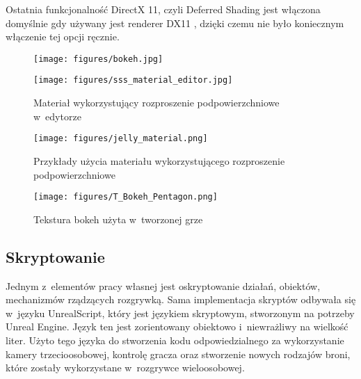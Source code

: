 Ostatnia funkcjonalność DirectX 11, czyli Deferred Shading jest włączona domyślnie gdy używany jest renderer DX11 \cite{udk_deferred_shading}, dzięki czemu nie było koniecznym włączenie tej opcji ręcznie.

\begin{figure}
\begin{center}
\texttt{[image: figures/bokeh.jpg]}
\label{bokeh_example}
\end{center}
\end{figure}

\begin{figure}
\begin{center}
\texttt{[image: figures/sss\_material\_editor.jpg]}
\caption{Materiał wykorzystujący rozproszenie podpowierzchniowe w~edytorze}
\label{sss_material_editor}
\end{center}
\end{figure}

\begin{figure}
\begin{center}
\texttt{[image: figures/jelly\_material.png]}
\caption{Przykłady użycia materiału wykorzystującego rozproszenie podpowierzchniowe}
\label{sss_material_example}
\end{center}
\end{figure}

\begin{figure}
\begin{center}
\texttt{[image: figures/T\_Bokeh\_Pentagon.png]}
\caption{Tekstura bokeh użyta w~tworzonej grze}
\label{bokeh_texture}
\end{center}
\end{figure}

\subsection{Skryptowanie}

Jednym z~elementów pracy własnej jest oskryptowanie działań, obiektów, mechanizmów rządzących rozgrywką. Sama implementacja skryptów odbywała się w~języku UnrealScript, który jest językiem skryptowym, stworzonym na potrzeby Unreal Engine. Język ten jest zorientowany obiektowo i~niewrażliwy na wielkość liter. Użyto tego języka do stworzenia kodu odpowiedzialnego za wykorzystanie kamery trzecioosobowej, kontrolę gracza oraz stworzenie nowych rodzajów broni, które zostały wykorzystane w~rozgrywce wieloosobowej.

